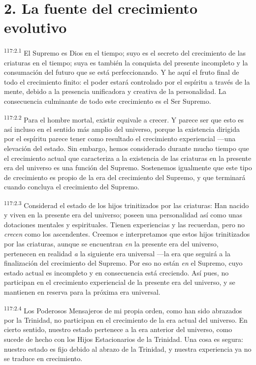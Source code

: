 \documentclass[twoside, 11pt]{book}
\begin{document}
\section*{2. La fuente del crecimiento evolutivo}
\par
\textsuperscript{117:2.1} El Supremo es Dios en el tiempo; suyo es el secreto del crecimiento de las criaturas en el tiempo; suya es también la conquista del presente incompleto y la consumación del futuro que se está perfeccionando. Y he aquí el fruto final de todo el crecimiento finito: el poder estará controlado por el espíritu a través de la mente, debido a la presencia unificadora y creativa de la personalidad. La consecuencia culminante de todo este crecimiento es el Ser Supremo.

\par
\textsuperscript{117:2.2} Para el hombre mortal, existir equivale a crecer. Y parece ser que esto es así incluso en el sentido más amplio del universo, porque la existencia dirigida por el espíritu parece tener como resultado el crecimiento experiencial ---una elevación del estado. Sin embargo, hemos considerado durante mucho tiempo que el crecimiento actual que caracteriza a la existencia de las criaturas en la presente era del universo es una función del Supremo. Sostenemos igualmente que este tipo de crecimiento es propio de la era del crecimiento del Supremo, y que terminará cuando concluya el crecimiento del Supremo.

\par
\textsuperscript{117:2.3} Considerad el estado de los hijos trinitizados por las criaturas: Han nacido y viven en la presente era del universo; poseen una personalidad así como unas dotaciones mentales y espirituales. Tienen experiencias y las recuerdan, pero no \textit{crecen} como los ascendentes. Creemos e interpretamos que estos hijos trinitizados por las criaturas, aunque se encuentran \textit{en} la presente era del universo, pertenecen en realidad \textit{a} la siguiente era universal ---la era que seguirá a la finalización del crecimiento del Supremo. Por eso no están \textit{en} el Supremo, cuyo estado actual es incompleto y en consecuencia está creciendo. Así pues, no participan en el crecimiento experiencial de la presente era del universo, y se mantienen en reserva para la próxima era universal.

\par
\textsuperscript{117:2.4} Los Poderosos Mensajeros de mi propia orden, como han sido abrazados por la Trinidad, no participan en el crecimiento de la era actual del universo. En cierto sentido, nuestro estado pertenece a la era anterior del universo, como sucede de hecho con los Hijos Estacionarios de la Trinidad. Una cosa es segura: nuestro estado es fijo debido al abrazo de la Trinidad, y nuestra experiencia ya no se traduce en crecimiento.
\end{document}
